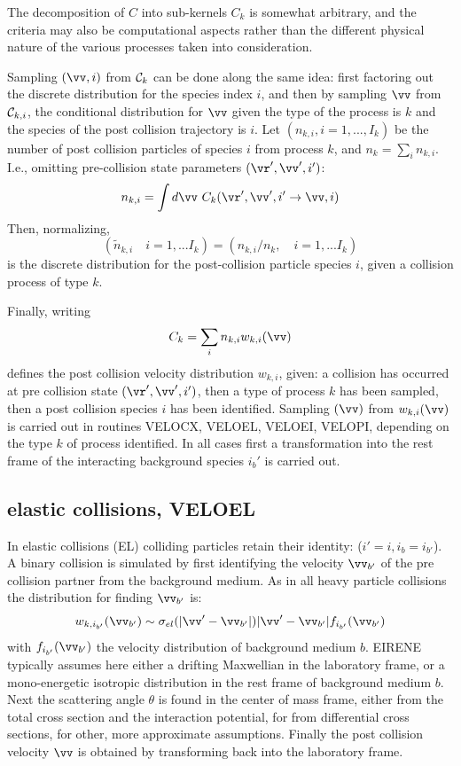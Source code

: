 The decomposition of $C$ into sub-kernels $C_k$ is somewhat
arbitrary, and the criteria may also be computational aspects
rather than the different physical nature of the various processes
taken into consideration.

Sampling $(\vv,i)$ from ${\cal{C}}_k$ can be done along
the same idea: first factoring out the discrete distribution for
the species index $i$, and then by sampling $\vv$ from
${\cal{C}}_{k,i}$, the conditional distribution for
$\vv$ given the type of the process is $k$ and the
species of the post collision trajectory is $i$. Let $(n_{k,i},
i=1,...,I_k)$ be the number of post collision particles of
species $i$ from process $k$, and $n_k = \sum_{i} n_{k,i}$.
I.e., omitting pre-collision state parameters $(\vr ' , \vv ' , i ')$:
\begin{displaymath}
n_{k,i} = \int d \vv \ C_k (
\vr ' , \vv ' , i ' \rightarrow
\vv , i )
\end{displaymath}
Then, normalizing,
\begin{displaymath}
(\tilde{n}_{k,i} \quad i=1,...I_k)
 = (n_{k,i}/n_k, \quad i=1,...I_k)
\end{displaymath}
is the discrete distribution for the post-collision particle
species $i$, given a collision process of type $k$.

Finally, writing
\begin{displaymath}
C_{k} = \sum_i n_{k,i} w_{k,i}(\vv)
\end{displaymath}
defines the post collision velocity distribution $w_{k,i}$, given: a collision has occurred at
pre collision state $(\vr ' , \vv ' , i ')$, then a type of process $k$ has been sampled, then a post collision species
$i$ has been identified. Sampling $(\vv)$ from $w_{k,i}(\vv)$ is carried out in routines VELOCX, VELOEL, VELOEI, VELOPI,
depending on the type $k$ of process identified. In all cases first a transformation into the rest frame of the
interacting background species $i_b'$ is carried out.

\subsection{elastic collisions, VELOEL}

In elastic collisions (EL) colliding particles retain their identity: ($i' = i,  i_b = i_{b'}$). A binary collision
is simulated by first identifying the velocity $\vv_{b'}$ of the pre collision partner from the background medium.
As in all heavy particle collisions the distribution for finding $\vv_{b'}$ is:
\begin{displaymath}
w_{k,i_{b'}}(\vv_{b'}) \sim \sigma_{el}(|\vv'-\vv_{b'}|) |\vv'-\vv_{b'}| f_{i_{b'}}(\vv_{b'})
\end{displaymath}
with $f_{i_{b'}}(\vv_{b'})$ the velocity distribution of background medium $b$. EIRENE typically assumes here
either a drifting Maxwellian in the laboratory frame, or a mono-energetic isotropic distribution in the rest frame of background medium $b$.
Next the scattering angle $\theta$ is found in the center of mass frame, either from the total cross section and the interaction
potential, for from differential cross sections, for other, more approximate assumptions. Finally the post collision velocity
$\vv$ is obtained by transforming back into the laboratory frame.
